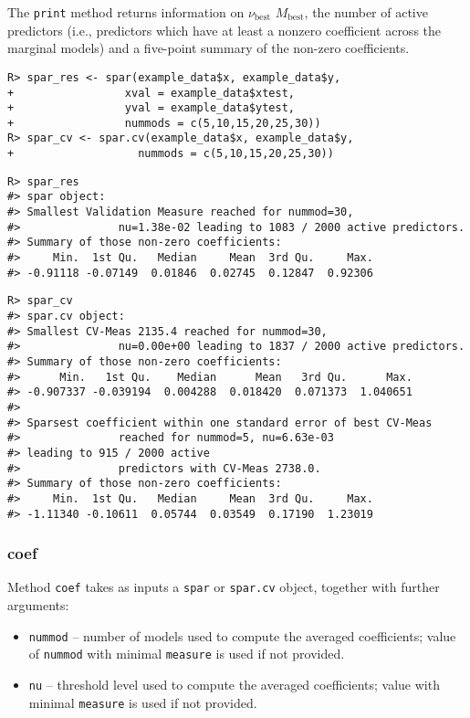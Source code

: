 \documentclass[
  article]{jss}
\begin{document}
The \texttt{print} method returns information on \(\nu_\text{best}\)
\(M_\text{best}\), the number of active predictors (i.e., predictors
which have at least a nonzero coefficient across the marginal models)
and a five-point summary of the non-zero coefficients.

\begin{verbatim}
R> spar_res <- spar(example_data$x, example_data$y,
+                 xval = example_data$xtest,
+                 yval = example_data$ytest,
+                 nummods = c(5,10,15,20,25,30))
R> spar_cv <- spar.cv(example_data$x, example_data$y,
+                   nummods = c(5,10,15,20,25,30))
\end{verbatim}

\begin{verbatim}
R> spar_res
#> spar object:
#> Smallest Validation Measure reached for nummod=30,
#>               nu=1.38e-02 leading to 1083 / 2000 active predictors.
#> Summary of those non-zero coefficients:
#>     Min.  1st Qu.   Median     Mean  3rd Qu.     Max. 
#> -0.91118 -0.07149  0.01846  0.02745  0.12847  0.92306
\end{verbatim}

\begin{verbatim}
R> spar_cv
#> spar.cv object:
#> Smallest CV-Meas 2135.4 reached for nummod=30,
#>               nu=0.00e+00 leading to 1837 / 2000 active predictors.
#> Summary of those non-zero coefficients:
#>      Min.   1st Qu.    Median      Mean   3rd Qu.      Max. 
#> -0.907337 -0.039194  0.004288  0.018420  0.071373  1.040651 
#> 
#> Sparsest coefficient within one standard error of best CV-Meas
#>               reached for nummod=5, nu=6.63e-03 
#> leading to 915 / 2000 active
#>               predictors with CV-Meas 2738.0.
#> Summary of those non-zero coefficients:
#>     Min.  1st Qu.   Median     Mean  3rd Qu.     Max. 
#> -1.11340 -0.10611  0.05744  0.03549  0.17190  1.23019
\end{verbatim}

\subsubsection{coef}\label{coef}

Method \texttt{coef} takes as inputs a \texttt{spar} or \texttt{spar.cv}
object, together with further arguments:

\begin{itemize}
\item
  \texttt{nummod} -- number of models used to compute the averaged
  coefficients; value of \texttt{nummod} with minimal \texttt{measure}
  is used if not provided.
\item
  \texttt{nu} -- threshold level used to compute the averaged
  coefficients; value with minimal \texttt{measure} is used if not
  provided.
\end{itemize}
\end{document}
